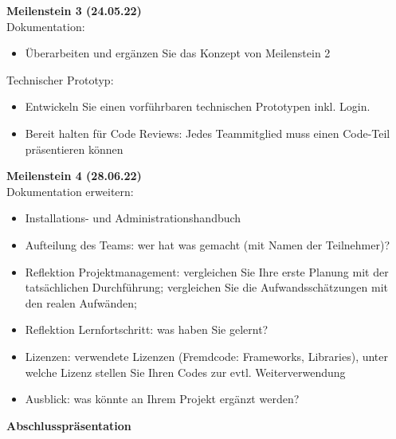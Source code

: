 \vspace{0.1\textwidth}

\textbf{Meilenstein 3 (24.05.22)} \\
Dokumentation: \\
\begin{itemize}
    \item Überarbeiten und ergänzen Sie das Konzept von Meilenstein 2
\end{itemize}
Technischer Prototyp: \\
\begin{itemize}
    \item Entwickeln Sie einen vorführbaren technischen Prototypen inkl. Login.
    \item Bereit halten für Code Reviews: Jedes Teammitglied muss einen Code-Teil präsentieren können
\end{itemize}


\textbf{Meilenstein 4 (28.06.22)}\\
Dokumentation erweitern:\\
\begin{itemize}
    \item Installations- und Administrationshandbuch
    \item Aufteilung des Teams: wer hat was gemacht (mit Namen der Teilnehmer)?
    \item Reflektion Projektmanagement: vergleichen Sie Ihre erste Planung mit der tatsächlichen Durchführung; vergleichen Sie die Aufwandsschätzungen mit den realen Aufwänden;
    \item Reflektion Lernfortschritt: was haben Sie gelernt?
    \item Lizenzen: verwendete Lizenzen (Fremdcode: Frameworks, Libraries), unter welche Lizenz stellen Sie Ihren Codes zur evtl. Weiterverwendung
    \item Ausblick: was könnte an Ihrem Projekt ergänzt werden?
\end{itemize}

\textbf{Abschlusspräsentation}